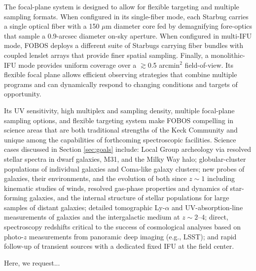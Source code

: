 The focal-plane system is designed to allow for flexible targeting
and multiple sampling formats. When configured in its single-fiber
mode, each Starbug carries a single optical fiber with a 150 $\mu$m
diameter core fed by demagnifying fore-optics that sample a
0.9-arcsec diameter on-sky aperture. When configured in multi-IFU
mode, FOBOS deploys a different suite of Starbugs carrying fiber
bundles with coupled lenslet arrays that provide finer spatial
sampling. Finally, a monolithic-IFU mode provides uniform coverage
over a $\gtrsim$0.5 arcmin$^2$ field-of-view. Its flexible focal
plane allows efficient observing strategies that combine multiple
programs and can dynamically respond to changing conditions and
targets of opportunity.

Its UV sensitivity, high multiplex and sampling density, multiple
focal-plane sampling options, and flexible targeting system make
FOBOS compelling in science areas that are both traditional strengths
of the Keck Community and unique among the capabilities of
forthcoming spectroscopic facilities. Science cases discussed in
Section \ref{sec:goals} include: Local Group archeology via resolved
stellar spectra in dwarf galaxies, M31, and the Milky Way halo;
globular-cluster populations of individual galaxies and Coma-like
galaxy clusters; new probes of galaxies, their environments, and the
evolution of both since $z \sim 1$ including kinematic studies of
winds, resolved gas-phase properties and dynamics of star-forming
galaxies, and the internal structure of stellar populations for large
samples of distant galaxies; detailed tomographic Ly-$\alpha$ and
UV-absorption-line measurements of galaxies and the intergalactic
medium at $z \sim 2$--4; direct, spectroscopy redshifts critical to
the success of cosmological analyses based on photo-$z$ measurements
from panoramic deep imaging (e.g., LSST); and rapid follow-up of
transient sources with a dedicated fixed IFU at the field center.

Here, we request...


